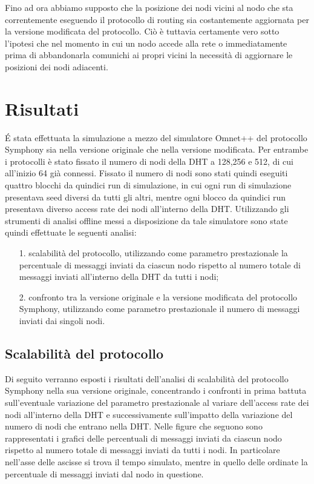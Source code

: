 \documentclass[	
	DIV=calc,
	paper=a4,
	fontsize=11pt,
	onecolumn
]{scrartcl} %
\begin{document}
Fino ad ora abbiamo supposto che la posizione dei nodi vicini al nodo che sta correntemente eseguendo il protocollo di routing sia costantemente aggiornata per la versione modificata del protocollo. Ciò è tuttavia certamente vero sotto l'ipotesi che nel momento in cui un nodo accede alla rete o immediatamente prima di abbandonarla comunichi ai propri vicini la necessità di aggiornare le posizioni dei nodi adiacenti.
\section{Risultati}
\'E stata effettuata la simulazione a mezzo del simulatore Omnet++ del protocollo Symphony sia nella versione originale che nella versione modificata. Per entrambe i protocolli è stato fissato il numero di nodi della DHT a 128,256 e 512, di cui all'inizio 64 già connessi. Fissato il numero di nodi sono stati quindi eseguiti quattro blocchi da quindici run di simulazione, in cui ogni run di simulazione presentava seed diversi da tutti gli altri, mentre ogni blocco da quindici run presentava diverso access rate dei nodi all'interno della DHT. Utilizzando gli strumenti di analisi offline messi a disposizione da tale simulatore sono state quindi effettuate le seguenti analisi:
	\begin{itemize}
	\item[1.] scalabilità del protocollo, utilizzando come parametro prestazionale la percentuale di messaggi inviati da ciascun nodo rispetto al numero totale di messaggi inviati all'interno della DHT da tutti i nodi;
	\item[2.] confronto tra la versione originale e la versione modificata del protocollo Symphony, utilizzando come parametro prestazionale il numero di messaggi inviati dai singoli nodi.
	\end{itemize}
	
	\subsection{Scalabilità del protocollo}
	Di seguito verranno esposti i risultati dell'analisi di scalabilità del protocollo Symphony nella sua versione originale, concentrando i confronti in prima battuta sull'eventuale variazione del parametro prestazionale al variare dell'access rate dei nodi all'interno della DHT e successivamente sull'impatto della variazione del numero di nodi che entrano nella DHT.
Nelle figure che seguono sono rappresentati i grafici delle percentuali di messaggi inviati da ciascun nodo rispetto al numero totale di messaggi inviati da tutti i nodi. In particolare nell'asse delle ascisse si trova il tempo simulato, mentre in quello delle ordinate la percentuale di messaggi inviati dal nodo in questione.
\end{document}

